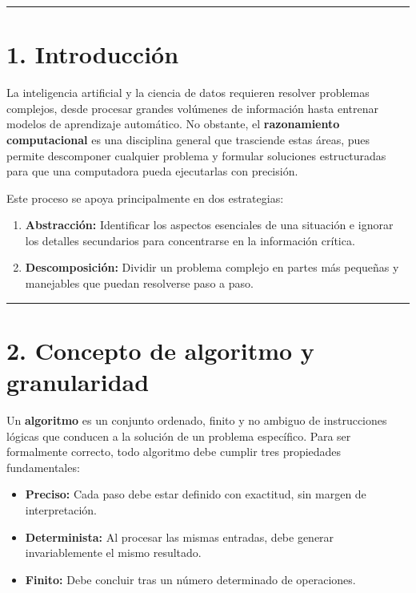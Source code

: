 \begin{center}\rule{0.5\linewidth}{0.5pt}\end{center}

\section{1. Introducción}\label{introducciuxf3n}

La inteligencia artificial y la ciencia de datos requieren resolver
problemas complejos, desde procesar grandes volúmenes de información
hasta entrenar modelos de aprendizaje automático. No obstante, el
\textbf{razonamiento computacional} es una disciplina general que
trasciende estas áreas, pues permite descomponer cualquier problema y
formular soluciones estructuradas para que una computadora pueda
ejecutarlas con precisión.

Este proceso se apoya principalmente en dos estrategias:

\begin{enumerate}
\def\labelenumi{\arabic{enumi}.}
\tightlist
\item
  \textbf{Abstracción:} Identificar los aspectos esenciales de una
  situación e ignorar los detalles secundarios para concentrarse en la
  información crítica.
\item
  \textbf{Descomposición:} Dividir un problema complejo en partes más
  pequeñas y manejables que puedan resolverse paso a paso.
\end{enumerate}

\begin{center}\rule{0.5\linewidth}{0.5pt}\end{center}

\section{2. Concepto de algoritmo y
granularidad}\label{concepto-de-algoritmo-y-granularidad}

Un \textbf{algoritmo} es un conjunto ordenado, finito y no ambiguo de
instrucciones lógicas que conducen a la solución de un problema
específico. Para ser formalmente correcto, todo algoritmo debe cumplir
tres propiedades fundamentales:

\begin{itemize}
\tightlist
\item
  \textbf{Preciso:} Cada paso debe estar definido con exactitud, sin
  margen de interpretación.
\item
  \textbf{Determinista:} Al procesar las mismas entradas, debe generar
  invariablemente el mismo resultado.
\item
  \textbf{Finito:} Debe concluir tras un número determinado de
  operaciones.
\end{itemize}

